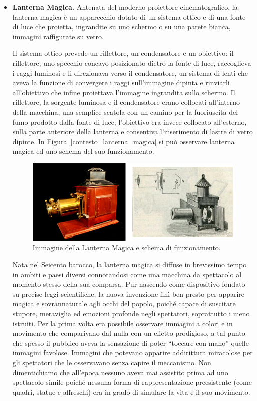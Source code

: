 \begin{itemize}
	\item \textbf{Lanterna Magica.}
	\label{contesto_lanterna_magica}
	Antenata del moderno proiettore cinematografico, la lanterna magica è un apparecchio dotato di un sistema ottico e di una fonte di luce che proietta, ingrandite su uno schermo o su una parete bianca, immagini raffigurate su vetro.
	
	Il sistema ottico prevede un riflettore, un condensatore e un obiettivo: il riflettore, uno specchio concavo posizionato dietro la fonte di luce, raccoglieva i raggi luminosi e li direzionava verso il condensatore, un sistema di lenti che aveva la funzione di convergere i raggi sull’immagine dipinta e rinviarli all’obiettivo che infine proiettava l’immagine ingrandita sullo schermo.
	Il riflettore, la sorgente luminosa e il condensatore erano collocati all’interno della macchina, una semplice scatola con un camino per la fuoriuscita del fumo prodotto dalla fonte di luce; l’obiettivo era invece collocato all’esterno, sulla parte anteriore della lanterna e consentiva l’inserimento di lastre di vetro dipinte.
	In Figura~\ref{contesto_lanterna_magica} si può osservare lanterna magica ed uno schema del suo funzionamento.
	
		\begin{figure}%
			\centering
			\includegraphics[width= 0.8\columnwidth]{images/contestoRiferimento/02_lanterna.jpg}
			\caption{Immagine della Lanterna Magica e schema di funzionamento.}
			\label{fig:contesto_riferimento_lanterna_magica}
		\end{figure}
	
	Nata nel Seicento barocco, la lanterna magica si diffuse in brevissimo tempo in ambiti e paesi diversi connotandosi come una macchina da spettacolo al momento stesso della sua comparsa. Pur nascendo come dispositivo fondato su precise leggi scientifiche, la nuova invenzione finì ben presto per apparire magica e sovrannaturale agli occhi del popolo, poiché capace di suscitare stupore, meraviglia ed emozioni profonde negli spettatori, soprattutto i meno istruiti. Per la prima volta era possibile osservare immagini a colori e in movimento che comparivano dal nulla con un effetto prodigioso, a tal punto che spesso il pubblico aveva la sensazione di poter “toccare con mano” quelle immagini favolose. Immagini che potevano apparire addirittura miracolose per gli spettatori che le osservavano senza capire il meccanismo. Non dimentichiamo che all’epoca nessuno aveva mai assistito prima ad uno spettacolo simile poiché nessuna forma di rappresentazione preesistente (come quadri, statue e affreschi) era in grado di simulare la vita e il suo movimento.
	

\end{itemize}
